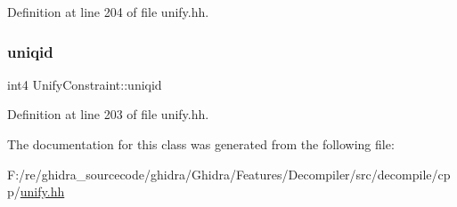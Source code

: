 Definition at line 204 of file unify.\+hh.

\mbox{\label{class_unify_constraint_a0cda7b149850ec9d85684f1d626751c0}} 
\subsubsection{\texorpdfstring{uniqid}{uniqid}}
{\footnotesize\ttfamily int4 Unify\+Constraint\+::uniqid\hspace{0.3cm}{\ttfamily [protected]}}



Definition at line 203 of file unify.\+hh.



The documentation for this class was generated from the following file\+:\begin{DoxyCompactItemize}
\item 
F\+:/re/ghidra\+\_\+sourcecode/ghidra/\+Ghidra/\+Features/\+Decompiler/src/decompile/cpp/\mbox{\hyperlink{unify_8hh}{unify.\+hh}}\end{DoxyCompactItemize}
